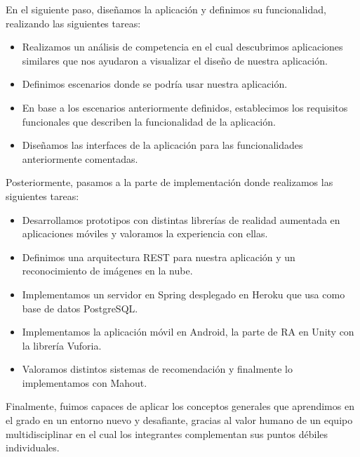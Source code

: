 En el siguiente paso, diseñamos la aplicación y definimos su funcionalidad,
 realizando las siguientes tareas:
\begin{itemize}
    \item Realizamos un análisis de competencia en el cual descubrimos aplicaciones
        similares que nos ayudaron a visualizar el diseño de nuestra aplicación.
    \item Definimos escenarios donde se podría usar nuestra aplicación.
    \item En base a los escenarios anteriormente definidos, establecimos los requisitos
        funcionales que describen la funcionalidad de la aplicación.
    \item Diseñamos las interfaces de la aplicación para las funcionalidades anteriormente
        comentadas.
\end{itemize}

Posteriormente, pasamos a la parte de implementación donde realizamos las siguientes
 tareas:
\begin{itemize}
    \item Desarrollamos prototipos con distintas librerías de realidad
        aumentada en aplicaciones móviles y valoramos la experiencia con ellas.
    \item Definimos una arquitectura REST para nuestra aplicación y un reconocimiento
        de imágenes en la nube.
    \item Implementamos un servidor en Spring desplegado en Heroku
        que usa como base de datos PostgreSQL.
    \item Implementamos la aplicación móvil en Android, la parte de RA en Unity con la
        librería Vuforia.
    \item Valoramos distintos sistemas de recomendación y finalmente lo implementamos
        con Mahout.
\end{itemize}

Finalmente, fuimos capaces de aplicar los conceptos generales que aprendimos
 en el grado en un entorno nuevo y desafiante, gracias al valor humano de
 un equipo multidisciplinar en el cual los integrantes complementan sus
 puntos débiles individuales. 
